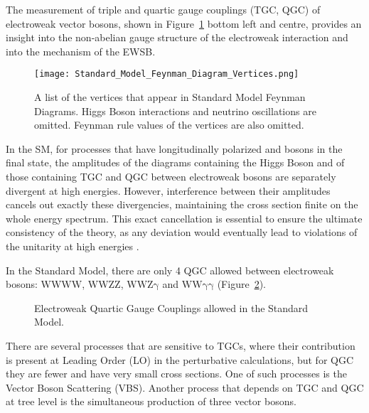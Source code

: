 The measurement of triple and quartic gauge couplings (TGC, QGC) of electroweak vector bosons, shown in Figure~\ref{fig:SMvertices} bottom left and centre, provides an insight into the non-abelian gauge structure of the electroweak interaction and into the mechanism of the EWSB.
%
\begin{figure}
	\centering
	\texttt{[image: Standard\_Model\_Feynman\_Diagram\_Vertices.png]}
	\caption{A list of the vertices that appear in Standard Model Feynman Diagrams. Higgs Boson interactions and neutrino oscillations are omitted. Feynman rule values of the vertices are also omitted. \cite{wikipedia_SM_feynman_vertices}}
        \label{fig:SMvertices}
\end{figure}

In the SM, for processes that have longitudinally polarized \PW and \PZ bosons in the final state,
the amplitudes of the diagrams containing the Higgs Boson and of those containing TGC and QGC between electroweak bosons are separately divergent at high energies.
However, interference between their amplitudes cancels out exactly these divergencies, maintaining the cross section finite on the whole energy spectrum.
This exact cancellation is essential to ensure the ultimate consistency of the theory, as any deviation would eventually lead to violations of the unitarity at high energies \cite{PhysRevLett.38.883}.

In the Standard Model, there are only 4 QGC allowed between electroweak bosons: $\mathrm{WWWW}$, $\mathrm{WWZZ}$, $\mathrm{WWZ\gamma}$ and $\mathrm{WW\gamma\gamma}$ (Figure~\ref{fig:EWQGC}).
\begin{figure}[ht]
  \centering
  \caption{Electroweak Quartic Gauge Couplings allowed in the Standard Model.}
  \label{fig:EWQGC}
\end{figure}

There are several processes that are sensitive to TGCs, where their contribution is present at Leading Order (LO) in the perturbative calculations,
but for QGC they are fewer and have very small cross sections.
One of such processes is the Vector Boson Scattering (VBS).
Another process that depends on TGC and QGC at tree level is the simultaneous production of three vector bosons.

